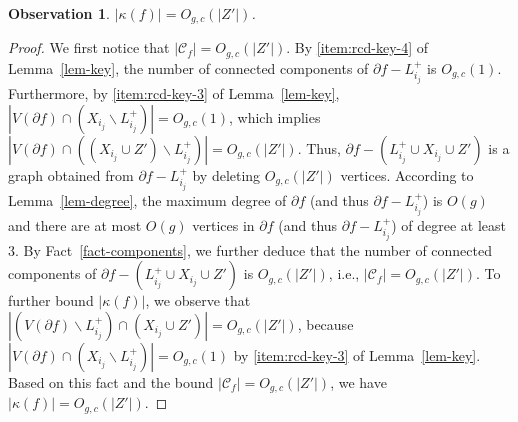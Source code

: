 \documentclass[a4paper,11pt]{article}
\numberwithin{lemma}{section}
\newtheorem{observation}[lemma]{Observation}
\begin{document}
\begin{observation} \label{obs-kappa}
$|\kappa(f)| = O_{g,c}(|Z'|)$.
\end{observation}
\begin{proof}
We first notice that $|\mathcal{C}_f| = O_{g,c}(|Z'|)$.
By \ref{item:rcd-key-4} of Lemma~\ref{lem-key}, the number of connected components of $\partial f - L_{i_j}^+$ is $O_{g,c}(1)$.
Furthermore, by \ref{item:rcd-key-3} of Lemma~\ref{lem-key}, $|V(\partial f) \cap (X_{i_j} \backslash L_{i_j}^+)| = O_{g,c}(1)$, which implies $|V(\partial f) \cap ((X_{i_j} \cup Z') \backslash L_{i_j}^+)| = O_{g,c}(|Z'|)$.
Thus, $\partial f - (L_{i_j}^+ \cup X_{i_j} \cup Z')$ is a graph obtained from $\partial f - L_{i_j}^+$ by deleting $O_{g,c}(|Z'|)$ vertices.
According to Lemma~\ref{lem-degree}, the maximum degree of $\partial f$ (and thus $\partial f - L_{i_j}^+$) is $O(g)$ and there are at most $O(g)$ vertices in $\partial f$ (and thus $\partial f - L_{i_j}^+$) of degree at least 3.
By Fact~\ref{fact-components}, we further deduce that the number of connected components of $\partial f - (L_{i_j}^+ \cup X_{i_j} \cup Z')$ is $O_{g,c}(|Z'|)$, i.e., $|\mathcal{C}_f| = O_{g,c}(|Z'|)$.
To further bound $|\kappa(f)|$, we observe that $|(V(\partial f) \backslash L_{i_j}^+) \cap (X_{i_j} \cup Z')| = O_{g,c}(|Z'|)$, because $|V(\partial f) \cap (X_{i_j} \backslash L_{i_j}^+)| = O_{g,c}(1)$ by \ref{item:rcd-key-3} of Lemma~\ref{lem-key}.
Based on this fact and the bound $|\mathcal{C}_f| = O_{g,c}(|Z'|)$, we have $|\kappa(f)| = O_{g,c}(|Z'|)$.
\end{proof}
\end{document}
